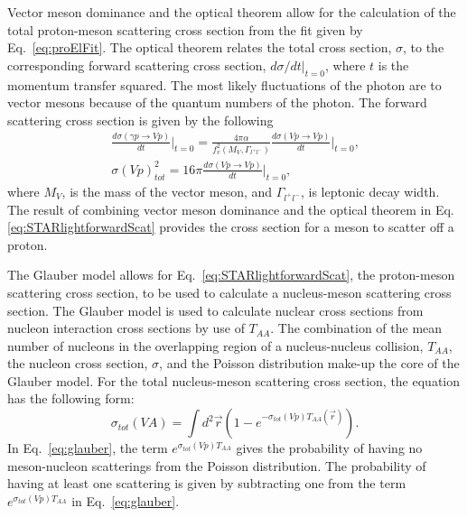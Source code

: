     Vector meson dominance and the optical theorem allow for the calculation of 
      the total proton-meson scattering cross section from the fit given by 
      Eq.~\ref{eq:proElFit}. 
    The optical theorem relates the total cross section, $\sigma$, 
      to the corresponding forward scattering cross section, 
      $d\sigma/dt|_{t=0}$, where $t$ is the momentum transfer squared.
    The most likely fluctuations of the photon are to vector mesons because of 
      the quantum numbers of the photon. 
    The forward scattering cross section is given by the following
    \begin{eqnarray} \label{eq:STARlightforwardScat}
      \frac{d\sigma(\gamma p\rightarrow Vp)}{dt}\Big|_{t=0}=
      \frac{4\pi \alpha}{f^{2}_{v}(M_{V},\Gamma_{l^{+}l^{-}})}\frac{d\sigma(Vp\rightarrow Vp)}{dt}
        \Big|_{t=0} \textrm{,} \nonumber \\
      \sigma(Vp)_{tot}^{2}=16\pi\frac{d\sigma(Vp\rightarrow Vp)}{dt}\Big|_{t=0} \textrm{,}
    \end{eqnarray}
      where $M_{V}$, is the mass of the vector meson, and $\Gamma_{l^{+}l^{-}}$, 
      is leptonic decay width. 
    The result of combining vector meson dominance and the optical theorem 
      in Eq.\ref{eq:STARlightforwardScat} provides the cross section for a meson to 
      scatter off a proton.

    The Glauber model allows for Eq.~\ref{eq:STARlightforwardScat}, the proton-meson
      scattering cross section, to be used to calculate a nucleus-meson 
      scattering cross section. 
    The Glauber model is used to calculate nuclear cross sections from 
      nucleon interaction cross sections by use of $T_{AA}$. 
    The combination of the mean number of nucleons in the overlapping region
      of a nucleus-nucleus collision, $T_{AA}$, the nucleon cross section, 
      $\sigma$, and the Poisson distribution make-up the core of the Glauber 
      model. 
    For the total nucleus-meson scattering cross section, the equation has the 
      following form:
    \begin{equation} \label{eq:glauber}
      \sigma_{tot}(VA)=\int d^{2}\vec{r}(1-e^{-\sigma_{tot}(Vp)T_{AA}(\vec{r})}).
    \end{equation}
    In Eq.~\ref{eq:glauber}, the term $e^{\sigma_{tot}(Vp)T_{AA}}$ gives the
      probability of having no meson-nucleon scatterings from the Poisson 
      distribution. 
    The probability of having at least one scattering is given by subtracting 
      one from the term  $e^{\sigma_{tot}(Vp)T_{AA}}$ in Eq.~\ref{eq:glauber}.

